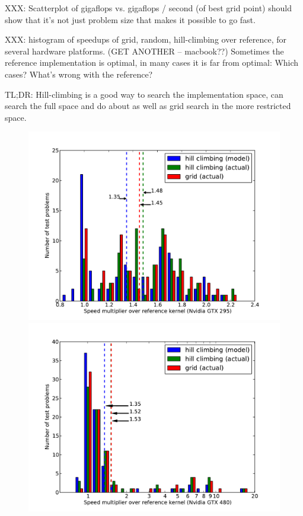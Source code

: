 \documentclass{sig-alternate}
\begin{document}
XXX: Scatterplot of gigaflops vs. gigaflops / second (of best grid point)
should show that it's not just problem size that makes it possible to go fast.


XXX: histogram of speedups of grid, random, hill-climbing over reference, for
several hardware platforms. (GET ANOTHER -- macbook??)
Sometimes the reference implementation is optimal, in many cases it is far
from optimal: Which cases? What's wrong with the reference?

TL;DR: Hill-climbing is a good way to search the implementation space, can
search the full space and do about as well as grid search in the more
restricted space.

\begin{figure}
\centering
\includegraphics[scale=.42]{speedup_295.pdf}
\includegraphics[scale=.42]{speedup_480.pdf}

\end{figure}
\end{document}
